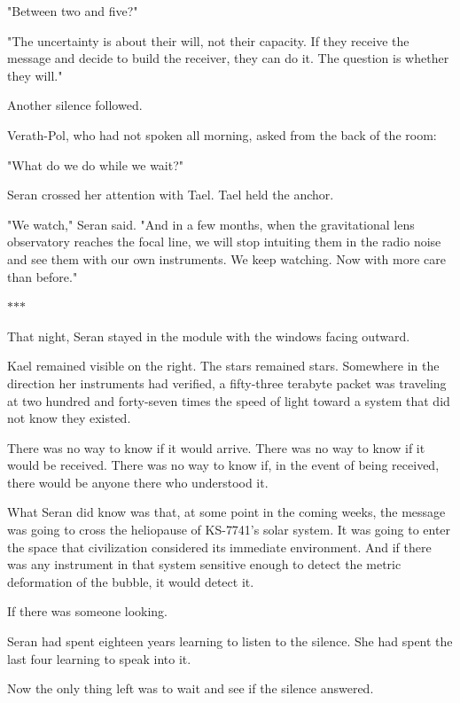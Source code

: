 \documentclass[11pt,a5paper,twoside]{book}
\begin{document}
"Between two and five?"

"The uncertainty is about their will, not their capacity. If they receive the message and decide to build the receiver, they can do it. The question is whether they will."

Another silence followed.

Verath-Pol, who had not spoken all morning, asked from the back of the room:

"What do we do while we wait?"

Seran crossed her attention with Tael. Tael held the anchor.

"We watch," Seran said. "And in a few months, when the gravitational lens observatory reaches the focal line, we will stop intuiting them in the radio noise and see them with our own instruments. We keep watching. Now with more care than before."

\vspace{1.5em}
\begin{center}$\ast$\quad$\ast$\quad$\ast$\end{center}
\vspace{1.5em}

That night, Seran stayed in the module with the windows facing outward.

Kael remained visible on the right. The stars remained stars. Somewhere in the direction her instruments had verified, a fifty-three terabyte packet was traveling at two hundred and forty-seven times the speed of light toward a system that did not know they existed.

There was no way to know if it would arrive. There was no way to know if it would be received. There was no way to know if, in the event of being received, there would be anyone there who understood it.

What Seran did know was that, at some point in the coming weeks, the message was going to cross the heliopause of KS-7741's solar system. It was going to enter the space that civilization considered its immediate environment. And if there was any instrument in that system sensitive enough to detect the metric deformation of the bubble, it would detect it.

If there was someone looking.

Seran had spent eighteen years learning to listen to the silence. She had spent the last four learning to speak into it.

Now the only thing left was to wait and see if the silence answered.
\end{document}
